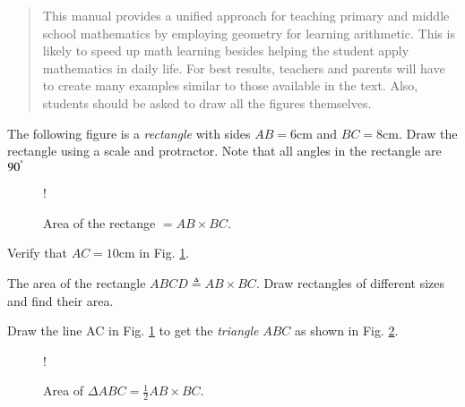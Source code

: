 \documentclass[journal,12pt,twocolumn]{IEEEtran}
\begin{document}
%

\bigskip

\begin{abstract}
This manual provides a unified approach for teaching primary and middle school mathematics by employing geometry for learning arithmetic. This is likely to speed up math learning besides helping the student apply mathematics in daily life.  
For best results, teachers and parents will have to create many examples similar to those available in the text. Also, students should be asked to draw all the figures themselves.
\end{abstract}
%
\begin{problem}
\label{prob:multiply}
The following figure is a {\em rectangle} with sides $AB = 6$cm and $BC = 8$cm.  Draw the rectangle using a scale and protractor.  Note that all angles in the rectangle are $90^{\degree}$
\end{problem}
%
%
\begin{figure}[!h]
\centering
\resizebox {\columnwidth} {!} {

}
\caption{Area of the rectange $= AB \times BC$.}
\label{fig:multiply}
\end{figure}
%
\begin{problem}
Verify that $AC = 10$cm in Fig. \ref{fig:multiply}. 
\end{problem}
\begin{problem}
The area of the rectangle $ABCD \triangleq AB \times BC$.  Draw rectangles of different sizes and find their area. 
\end{problem}
\begin{problem}
Draw the line AC in Fig. \ref{fig:multiply} to get the {\em triangle} $ABC$ as shown in Fig. \ref{fig:rt_triang}. 
\end{problem}
%
\begin{figure}[!h]
\centering
\resizebox {\columnwidth} {!} {

}
\caption{Area of $\Delta ABC= \frac{1}{2} AB \times BC$.}
\label{fig:rt_triang}
\end{figure}
\end{document}
